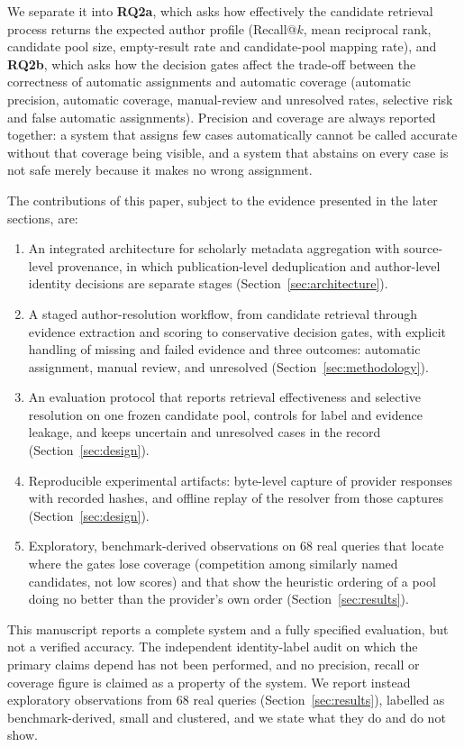 We separate it into \textbf{RQ2a}, which asks how effectively the candidate retrieval process returns the expected author profile (Recall@$k$, mean reciprocal rank, candidate pool size, empty-result rate and candidate-pool mapping rate), and \textbf{RQ2b}, which asks how the decision gates affect the trade-off between the correctness of automatic assignments and automatic coverage (automatic precision, automatic coverage, manual-review and unresolved rates, selective risk and false automatic assignments). Precision and coverage are always reported together: a system that assigns few cases automatically cannot be called accurate without that coverage being visible, and a system that abstains on every case is not safe merely because it makes no wrong assignment.

The contributions of this paper, subject to the evidence presented in the later sections, are:
\begin{enumerate}
  \item An integrated architecture for scholarly metadata aggregation with source-level provenance, in which publication-level deduplication and author-level identity decisions are separate stages (Section~\ref{sec:architecture}).
  \item A staged author-resolution workflow, from candidate retrieval through evidence extraction and scoring to conservative decision gates, with explicit handling of missing and failed evidence and three outcomes: automatic assignment, manual review, and unresolved (Section~\ref{sec:methodology}).
  \item An evaluation protocol that reports retrieval effectiveness and selective resolution on one frozen candidate pool, controls for label and evidence leakage, and keeps uncertain and unresolved cases in the record (Section~\ref{sec:design}).
  \item Reproducible experimental artifacts: byte-level capture of provider responses with recorded hashes, and offline replay of the resolver from those captures (Section~\ref{sec:design}).
  \item Exploratory, benchmark-derived observations on 68 real queries that locate where the gates lose coverage (competition among similarly named candidates, not low scores) and that show the heuristic ordering of a pool doing no better than the provider's own order (Section~\ref{sec:results}).
\end{enumerate}

This manuscript reports a complete system and a fully specified evaluation, but not a verified accuracy. The independent identity-label audit on which the primary claims depend has not been performed, and no precision, recall or coverage figure is claimed as a property of the system. We report instead exploratory observations from 68 real queries (Section~\ref{sec:results}), labelled as benchmark-derived, small and clustered, and we state what they do and do not show.


